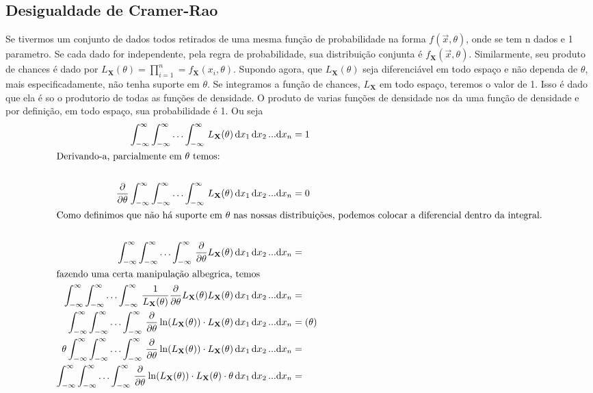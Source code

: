 \subsection{Desigualdade de Cramer-Rao}
Se tivermos um conjunto de dados todos retirados de uma mesma função de probabilidade na forma
\(f(\vec{x},\theta )\), onde se tem n dados e 1 parametro. Se cada dado for independente, pela regra
de probabilidade, sua distribuição conjunta é \(f_{\mathbf{X}}(\vec{x},\theta)\). Similarmente, seu
produto de chances é dado por \(L_{\mathbf{X}}(\theta )=\prod_{i=1}^{n}= f_{\mathbf{X}}(x_i,\theta )\). Supondo
agora, que \(L_{\mathbf{X}}(\theta)\) seja diferenciável em todo espaço e não dependa de \(\theta
\), mais especificadamente, não tenha suporte em \(\theta \). Se integramos a função de chances,
\(L_{\mathbf{X}} \) em todo espaço, teremos o valor de 1. Isso é dado que ela é so o produtorio de
todas as funções de densidade. O produto de varias funções de densidade nos da uma função de
densidade e por definição, em todo espaço, sua probabilidade é 1. Ou seja
\begin{align}
    \int_{-\infty}^{\infty} \int_{-\infty}^{\infty} \ldots \int_{-\infty}^{\infty}  \,  L_{\mathbf{X}}(\theta ) \,\mathrm{d}x_1  \,\mathrm{d}x_2 \,...\mathrm{d}x_n&=1\\
    \intertext{Derivando-a, parcialmente em \(\theta\) temos:}\notag\\
    \frac{\partial}{\partial \theta } \int_{-\infty}^{\infty} \int_{-\infty}^{\infty} \ldots \int_{-\infty}^{\infty}  \,  L_{\mathbf{X}}(\theta ) \,\mathrm{d}x_1  \,\mathrm{d}x_2 \,...\mathrm{d}x_n&=0\\
    \intertext{Como definimos que não há suporte em \(\theta \) nas nossas distribuições, podemos colocar a
    diferencial dentro da integral.}\notag\\  
    \int_{-\infty}^{\infty} \int_{-\infty}^{\infty} \ldots \int_{-\infty}^{\infty}  \, \frac{\partial}{\partial \theta } L_{\mathbf{X}}(\theta ) \,\mathrm{d}x_1  \,\mathrm{d}x_2 \,...\mathrm{d}x_n&=\\
    \intertext{fazendo uma certa manipulação albegrica, temos}\notag
    \int_{-\infty}^{\infty} \int_{-\infty}^{\infty} \ldots \int_{-\infty}^{\infty}  \,\frac{1}{L_{\mathbf{X}}(\theta )} \frac{\partial}{\partial \theta } L_{\mathbf{X}}(\theta ) L_{\mathbf{X}}(\theta )\,\mathrm{d}x_1  \,\mathrm{d}x_2 \,...\mathrm{d}x_n&=\\
    \int_{-\infty}^{\infty} \int_{-\infty}^{\infty} \ldots \int_{-\infty}^{\infty}  \,\frac{\partial}{\partial \theta } \ln (L_{\mathbf{X}}(\theta )) \cdot L_{\mathbf{X}}(\theta )\,\mathrm{d}x_1  \,\mathrm{d}x_2 \,...\mathrm{d}x_n&=  (\theta )\\
    \theta \int_{-\infty}^{\infty} \int_{-\infty}^{\infty} \ldots \int_{-\infty}^{\infty}  \,\frac{\partial}{\partial \theta } \ln (L_{\mathbf{X}}(\theta )) \cdot L_{\mathbf{X}}(\theta )\,\mathrm{d}x_1  \,\mathrm{d}x_2 \,...\mathrm{d}x_n&=\\
    \label{eq:1 da fisher}
    \int_{-\infty}^{\infty} \int_{-\infty}^{\infty} \ldots \int_{-\infty}^{\infty}  \,\frac{\partial}{\partial \theta } \ln (L_{\mathbf{X}}(\theta )) \cdot L_{\mathbf{X}}(\theta ) \cdot \theta \,\mathrm{d}x_1  \,\mathrm{d}x_2 \,...\mathrm{d}x_n&=
\end{align}

